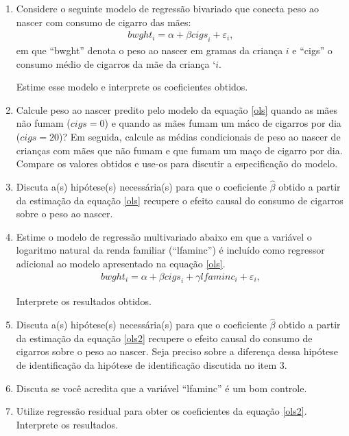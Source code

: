 \documentclass[a4paper, 12pt, final]{article}
\begin{document}
\begin{enumerate}
    
\item Considere o seguinte modelo de regressão bivariado que conecta peso ao nascer com consumo de cigarro das mães:   
\begin{align}
\label{ols}
bwght_i = \alpha + \beta {cigs}_{i} + \varepsilon_{i},
\end{align}    
em que ``bwght'' denota o peso ao nascer em gramas da criança $i$ e ``cigs'' o consumo médio de cigarros da mãe da criança `$i$. 

Estime esse modelo e interprete os coeficientes obtidos.

\item Calcule peso ao nascer predito pelo modelo da equação \eqref{ols} quando as mães não fumam ($cigs = 0$) e quando as mães fumam um máco de cigarros por dia ($cigs = 20$)? Em seguida, calcule as médias condicionais de peso ao nascer de crianças com mães que não fumam e que fumam um maço de cigarro por dia. Compare os valores obtidos e use-os para discutir a especificação do modelo.   

\item Discuta a(s) hipótese(s) necessária(s) para que o coeficiente $\hat{\beta}$ obtido a partir da estimação da equação \eqref{ols} recupere o efeito causal do consumo de cigarros sobre o peso ao nascer.
    
\item Estime o modelo de regressão multivariado abaixo em que a variável o logaritmo natural da renda familiar (``lfaminc'') é incluído como regressor adicional ao modelo apresentado na equação \eqref{ols}. 
\begin{align}
\label{ols2}
bwght_i = \alpha + \beta {cigs}_{i} + \gamma {lfaminc}_i + \varepsilon_{i},
\end{align} 

Interprete os resultados obtidos.

\item Discuta a(s) hipótese(s) necessária(s) para que o coeficiente $\hat{\beta}$ obtido a partir da estimação da equação \eqref{ols2} recupere o efeito causal do consumo de cigarros sobre o peso ao nascer. Seja preciso sobre a diferença dessa hipótese de identificação da hipótese de identificação discutida no item 3.

\item Discuta se você acredita que a variável ``lfaminc'' é um bom controle. 

\item Utilize regressão residual para obter os coeficientes da equação \eqref{ols2}. Interprete os resultados. 

	
\end{enumerate}         



        
\end{document}
